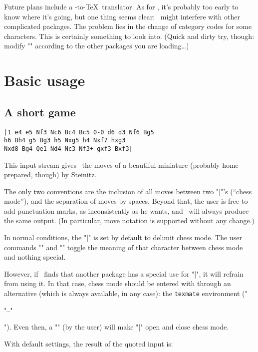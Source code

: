 \documentclass[12pt]{ltxdoc}
\begin{document}
Future plans include a -to-\TeX\ translator. As for \TeXmate, it's probably too early to know where it's going, but one thing seems clear: \TeXmate\ might interfere with other complicated packages. The problem lies in the change of category codes for some characters. This is certainly something to look into. (Quick and dirty try, though: modify "\@nochesscodes" according to the other packages you are loading\dots)

\pagebreak
\section{Basic usage}

\subsection{A short game}\label{first}
\makebarother
\begin{verbatim}
|1 e4 e5 Nf3 Nc6 Bc4 Bc5 0-0 d6 d3 Nf6 Bg5
h6 Bh4 g5 Bg3 h5 Nxg5 h4 Nxf7 hxg3 
Nxd8 Bg4 Qe1 Nd4 Nc3 Nf3+ gxf3 Bxf3|
\end{verbatim}

This input stream gives \TeXmate\ the moves of a beautiful miniature (probably home-prepared, though) by Steinitz. 

The only two conventions are the inclusion of all moves between two \DescribeMacro{|}\SpecialIndex{|}"|"'s (``chess mode''), and the separation of moves by spaces. Beyond that, the user is free to add punctuation marks, as inconsistently as he wants, and \TeXmate\ will always produce the same output. (In particular,  move notation is supported without any change.)

In normal conditions, the "|" is set by default to delimit chess mode. The user commands "\makebarother" and "\makebarchess"\DescribeMacro{\makebarchess}\DescribeMacro{\makebarother} toggle the meaning of that character between chess mode and nothing special. 

However, if \TeXmate\ finds that another package has a special use for "|", it will refrain from using it. In that case, chess mode should be entered with through an alternative (which is always available, in any case): the \texttt{texmate} environment ("\begin{texmate}"--"\end{texmate}"). Even then, a "\makebarchess" (by the user) will make "|" open and close chess mode. 

\bigskip\noindent
With default settings, the result of the quoted input is:
\end{document}
